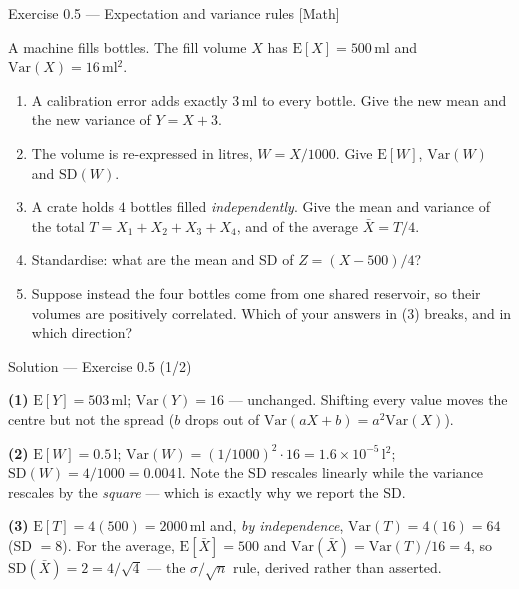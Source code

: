 \documentclass[aspectratio=169,11pt]{beamer}
\begin{document}
\begin{frame}{Exercise 0.5 --- Expectation and variance rules [Math]}
  \begin{exercise}
    A machine fills bottles. The fill volume $X$ has
    $\mathrm{E}[X] = 500$\,ml and $\mathrm{Var}(X) = 16$\,ml$^2$.
    \begin{enumerate}
      \item A calibration error adds exactly $3$\,ml to every bottle. Give the
            new mean and the new variance of $Y = X + 3$.
      \item The volume is re-expressed in litres, $W = X/1000$. Give
            $\mathrm{E}[W]$, $\mathrm{Var}(W)$ and $\mathrm{SD}(W)$.
      \item A crate holds $4$ bottles filled \emph{independently}. Give the
            mean and variance of the total $T = X_1 + X_2 + X_3 + X_4$, and of
            the average $\bar X = T/4$.
      \item Standardise: what are the mean and SD of $Z = (X - 500)/4$?
      \item Suppose instead the four bottles come from one shared reservoir,
            so their volumes are positively correlated. Which of your answers
            in (3) breaks, and in which direction?
    \end{enumerate}
  \end{exercise}
\end{frame}

\begin{frame}{Solution --- Exercise 0.5 (1/2)}
  \begin{solutionbox}
    \textbf{(1)} $\mathrm{E}[Y] = 503$\,ml; $\mathrm{Var}(Y) = 16$ ---
    unchanged. Shifting every value moves the centre but not the spread
    ($b$ drops out of $\mathrm{Var}(aX+b) = a^2\mathrm{Var}(X)$).

    \textbf{(2)} $\mathrm{E}[W] = 0.5$\,l;
    $\mathrm{Var}(W) = (1/1000)^2 \cdot 16 = 1.6\times10^{-5}$\,l$^2$;
    $\mathrm{SD}(W) = 4/1000 = 0.004$\,l. Note the SD rescales linearly while
    the variance rescales by the \emph{square} --- which is exactly why we
    report the SD.

    \textbf{(3)} $\mathrm{E}[T] = 4(500) = 2000$\,ml and, \emph{by
    independence}, $\mathrm{Var}(T) = 4(16) = 64$ (SD $= 8$).
    For the average, $\mathrm{E}[\bar X] = 500$ and
    $\mathrm{Var}(\bar X) = \mathrm{Var}(T)/16 = 4$, so
    $\mathrm{SD}(\bar X) = 2 = 4/\sqrt{4}$ --- the $\sigma/\sqrt n$ rule,
    derived rather than asserted.
  \end{solutionbox}
\end{frame}
\end{document}
